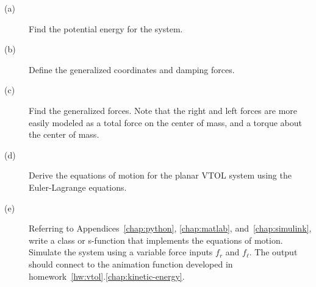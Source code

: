     \begin{description}
    \item[(a)] Find the potential energy for the system.
    \item[(b)] Define the generalized coordinates and damping forces.
    \item[(c)] Find the generalized forces.  Note that the right and left forces are more easily modeled as a total force on the center of mass, and a torque about the center of mass.
    \item[(d)] Derive the equations of motion for the planar VTOL system using the Euler-Lagrange equations.
	\item[(e)] Referring to Appendices~\ref{chap:python}, \ref{chap:matlab}, and~\ref{chap:simulink}, write a class or s-function that implements the equations of motion.  Simulate the system using a variable force inputs $f_r$ and $f_\ell$.  The output should connect to the animation function developed in homework~\ref{hw:vtol}.\ref{chap:kinetic-energy}.
    \end{description}
